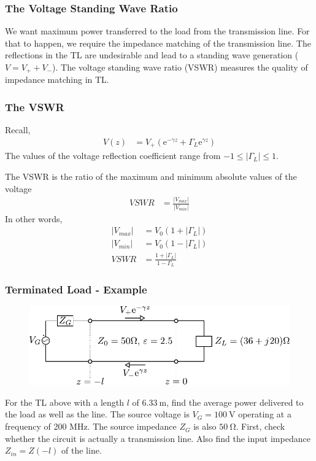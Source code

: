 \documentclass[10pt, compress]{beamer}
\newcommand{\e}{\mathrm{e}} %
\begin{document}
\begin{frame}
  \frametitle{The Voltage Standing Wave Ratio}
\begin{outline}
  \1 We want maximum power transferred to the load from the transmission line.
  \2 For that to happen, we require the impedance matching of the transmission line.
  \1 The reflections in the TL are undesirable and lead to a standing wave generation ($V = V_{+} + V_{-}$).
  \1 The voltage standing wave ratio (VSWR) measures the quality of impedance matching in TL.
\end{outline}
\end{frame}

\begin{frame}
  \frametitle{The VSWR}

  Recall, 
  \begin{align*}
    V(z) &= V_{+} \left( \e^{- \gamma z} + \Gamma_L \e^{ \gamma z} \right)
  \end{align*}
  The values of the voltage reflection coefficient range from $-1 \le |\Gamma_L| \le 1$.

  The VSWR is the ratio of the maximum and minimum absolute values of the voltage
  \begin{align*}
    VSWR &= \frac{|V_{max}|}{|V_{min}|}
  \end{align*}
  In other words,
  \begin{align*}
    |V_{max}| &= V_0 \left(1 + |\Gamma_L|\right) \\
    |V_{min}| &= V_0 \left(1 - |\Gamma_L|\right) \\  
    VSWR &= \frac{1 + |\Gamma_L|}{1 - \Gamma_L}
  \end{align*}
\end{frame}

\begin{frame}
  \frametitle{Terminated Load - Example}
\begin{figure}[t!]
  \centering
  \includegraphics[width=.9\textwidth]{tline_terminated_example.pdf}
\end{figure}
  For the TL above with a length $l$ of $\SI{6.33}{\m}$, find the average power delivered to the load as well as the line. The source voltage is $V_G = \SI{100}{\volt}$ operating at a frequency of 200 MHz. The source impedance $Z_G$ is also $\SI{50}{\ohm}$. First, check whether the circuit is actually a transmission line. Also find the input impedance $Z_{in} = Z(-l)$ of the line.
\end{frame}
\end{document}
